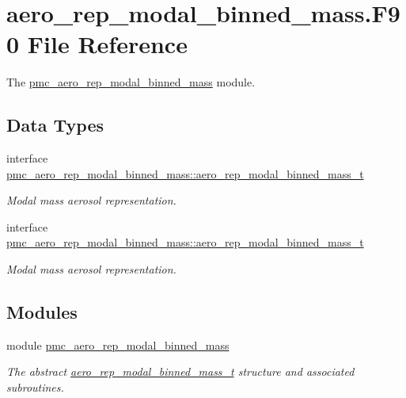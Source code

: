 \hypertarget{aero__rep__modal__binned__mass_8_f90}{}\section{aero\+\_\+rep\+\_\+modal\+\_\+binned\+\_\+mass.\+F90 File Reference}
\label{aero__rep__modal__binned__mass_8_f90}


The \mbox{\hyperlink{namespacepmc__aero__rep__modal__binned__mass}{pmc\+\_\+aero\+\_\+rep\+\_\+modal\+\_\+binned\+\_\+mass}} module.  


\subsection*{Data Types}
\begin{DoxyCompactItemize}
\item 
interface \mbox{\hyperlink{structpmc__aero__rep__modal__binned__mass_1_1aero__rep__modal__binned__mass__t}{pmc\+\_\+aero\+\_\+rep\+\_\+modal\+\_\+binned\+\_\+mass\+::aero\+\_\+rep\+\_\+modal\+\_\+binned\+\_\+mass\+\_\+t}}
\begin{DoxyCompactList}\small\item\em Modal mass aerosol representation. \end{DoxyCompactList}\item 
interface \mbox{\hyperlink{structpmc__aero__rep__modal__binned__mass_1_1aero__rep__modal__binned__mass__t}{pmc\+\_\+aero\+\_\+rep\+\_\+modal\+\_\+binned\+\_\+mass\+::aero\+\_\+rep\+\_\+modal\+\_\+binned\+\_\+mass\+\_\+t}}
\begin{DoxyCompactList}\small\item\em Modal mass aerosol representation. \end{DoxyCompactList}\end{DoxyCompactItemize}
\subsection*{Modules}
\begin{DoxyCompactItemize}
\item 
module \mbox{\hyperlink{namespacepmc__aero__rep__modal__binned__mass}{pmc\+\_\+aero\+\_\+rep\+\_\+modal\+\_\+binned\+\_\+mass}}
\begin{DoxyCompactList}\small\item\em The abstract \mbox{\hyperlink{structpmc__aero__rep__modal__binned__mass_1_1aero__rep__modal__binned__mass__t}{aero\+\_\+rep\+\_\+modal\+\_\+binned\+\_\+mass\+\_\+t}} structure and associated subroutines. \end{DoxyCompactList}\end{DoxyCompactItemize}
